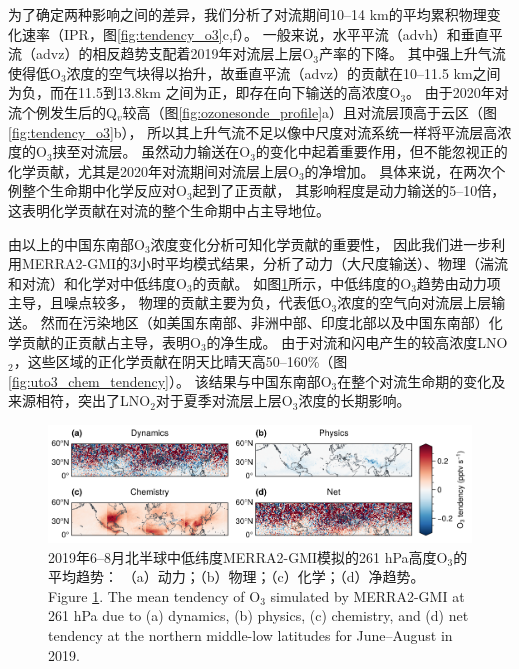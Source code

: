 为了确定两种影响之间的差异，我们分析了对流期间10--14 km的平均累积物理变化速率（IPR，图\ref{fig:tendency_o3}c,f）。
一般来说，水平平流（advh）和垂直平流（advz）的相反趋势支配着2019年对流层上层O$_3$产率的下降。
其中强上升气流使得低O$_3$浓度的空气块得以抬升，故垂直平流（advz）的贡献在10--11.5 km之间为负，而在11.5到13.8km 之间为正，即存在向下输送的高浓度O$_3$。
由于2020年对流个例发生后的Q$_v$较高（图\ref{fig:ozonesonde_profile}a）且对流层顶高于云区（图\ref{fig:tendency_o3}b），
所以其上升气流不足以像中尺度对流系统一样将平流层高浓度的O$_3$挟至对流层\citep{Phoenix.2020}。
虽然动力输送在O$_3$的变化中起着重要作用，但不能忽视正的化学贡献，尤其是2020年对流期间对流层上层O$_3$的净增加。
具体来说，在两次个例整个生命期中化学反应对O$_3$起到了正贡献，
其影响程度是动力输送的5--10倍，这表明化学贡献在对流的整个生命期中占主导地位。

由以上的中国东南部O$_3$浓度变化分析可知化学贡献的重要性，
因此我们进一步利用MERRA2-GMI的3小时平均模式结果，分析了动力（大尺度输送）、物理（湍流和对流）和化学对中低纬度O$_3$的贡献。
如图\ref{fig:uto3_tendency}所示，中低纬度的O$_3$趋势由动力项主导，且噪点较多，
物理的贡献主要为负，代表低O$_3$浓度的空气向对流层上层输送。
然而在污染地区（如美国东南部、非洲中部、印度北部以及中国东南部）化学贡献的正贡献占主导，表明O$_3$的净生成。
由于对流和闪电产生的较高浓度LNO$_2$，这些区域的正化学贡献在阴天比晴天高50--160\%（图\ref{fig:uto3_chem_tendency}）。
该结果与中国东南部O$_3$在整个对流生命期的变化及来源相符，突出了LNO$_2$对于夏季对流层上层O$_3$浓度的长期影响。


\begin{figure}[H]
    \centering
    \includegraphics[width=\textwidth]{./figures/uto3_tendency.png}
    \caption{
    2019年6--8月北半球中低纬度MERRA2-GMI模拟的261 hPa高度O$_3$的平均趋势：
    （a）动力；（b）物理；（c）化学；（d）净趋势。\\
    Figure \ref{fig:uto3_tendency}. The mean tendency of O$_3$ simulated by MERRA2-GMI at 261 hPa due to (a) dynamics, (b) physics, (c) chemistry, and (d) net tendency at the northern middle-low latitudes for June--August in 2019.
    }
    \label{fig:uto3_tendency}
\end{figure}


